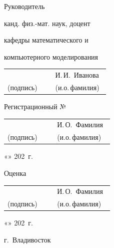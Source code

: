 \documentclass[14pt,a4paper]{extarticle}
\makeatletter
\newcommand{\maintitle}[1]{%
  {\fontsize{14}{16}\selectfont #1\par}%
}
\newcommand{\labeltiny}[1]{%
  {\fontsize{8}{9}\selectfont #1}%
}
\newcommand{\datefield}{%
  «\underline{\hspace{0.8cm}}» \underline{\hspace{3.2cm}} 202\underline{\hspace{0.35cm}}~г.
}
\newcommand{\signaturepair}[2]{%
  \begin{tabular}{@{}p{0.44\linewidth}@{\hspace{0.06\linewidth}}p{0.50\linewidth}@{}}
    \centering\hrulefill & \centering #1\tabularnewline
    \centering\labeltiny{(подпись)} & \centering\labeltiny{#2}
  \end{tabular}%
}
\makeatother
\begin{document}
\begin{titlepage}
\begin{minipage}[t]{0.47\textwidth}
  \maintitle{Руководитель}
  \maintitle{канд. физ.-мат. наук, доцент}
  \maintitle{кафедры математического и}
  \maintitle{компьютерного моделирования}
  \vspace{0.25cm}

  \signaturepair{И.\,И.~Иванова}{(и.о.\,фамилия)}
\end{minipage}

\vfill

\noindent
\begin{minipage}[t]{0.46\textwidth}
  \raggedright
  \maintitle{Регистрационный № \underline{\hspace{2.7cm}}}
  \vspace{0.45cm}

  \signaturepair{И.\,О.~Фамилия}{(и.о.\,фамилия)}

  \vspace{0.3cm}
  \maintitle{\datefield}
\end{minipage}
\hfill
\begin{minipage}[t]{0.46\textwidth}
  \raggedright
  \maintitle{Оценка \underline{\hspace{4.3cm}}}
  \vspace{0.45cm}

  \signaturepair{И.\,О.~Фамилия}{(и.о.\,фамилия)}

  \vspace{0.3cm}
  \maintitle{\datefield}
\end{minipage}

\vspace{0.7cm}
\maintitle{г.~Владивосток}
\maintitle{202\underline{\hspace{0.35cm}}}

\end{titlepage}
\end{document}
